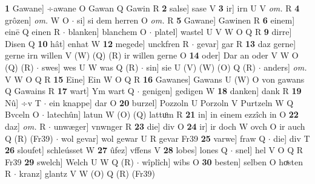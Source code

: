 \documentclass[8pt,a4paper,notitlepage]{article}
\begin{document}
\begin{table}[ht]
\begin{minipage}[t]{0.5\linewidth}
\textbf{1} Gawane] ÷awane O Gawan Q Gawin R \textbf{2} salse] sase V \textbf{3} ir] irn U V \textit{om.} R \textbf{4} grôzen] \textit{om.} W O  $\cdot$ si] si dem herren O \textit{om.} R \textbf{5} Gawane] Gawinen R \textbf{6} einem] einē Q einen R  $\cdot$ blanken] blanchem O  $\cdot$ platel] wastel U V W O Q R \textbf{9} dirre] Disen Q \textbf{10} hât] enhat W \textbf{12} megede] unckfren R  $\cdot$ gevar] gar R \textbf{13} daz gerne] gerne irn willen V (W) (Q) (R) ir willen gerne O \textbf{14} oder] Dar an oder V W O (Q) (R)  $\cdot$ swes] wes U W was Q (R)  $\cdot$ sin] sie U (V) (W) (O) Q (R)  $\cdot$ anders] \textit{om.} V W O Q R \textbf{15} Eine] Ein W O Q R \textbf{16} Gawanes] Gawans U (W) O von gawans Q Gawains R \textbf{17} wart] Ym wart Q  $\cdot$ genigen] gedigen W \textbf{18} danken] dank R \textbf{19} Nû] ÷v T  $\cdot$ ein knappe] dar O \textbf{20} burzel] Pozzoln U Porzoln V Purtzeln W Q Bvceln O  $\cdot$ latechûn] latun W (O) (Q) lattuͦm R \textbf{21} in] in einem ezzîch in O \textbf{22} daz] \textit{om.} R  $\cdot$ unwæger] vnwnger R \textbf{23} die] div O \textbf{24} ir] ir doch W ovch O ir auch Q (R) (Fr39)  $\cdot$ wol gevar] wol gewar U R gevar Fr39 \textbf{25} varwe] fraw Q  $\cdot$ die] div T \textbf{26} sloufet] schleússet W \textbf{27} ûfez] vffens V \textbf{28} lobes] lones Q  $\cdot$ snel] hel V O Q R Fr39 \textbf{29} swelch] Welch U W Q (R)  $\cdot$ wîplîch] wibs O \textbf{30} besten] selben O hoͯsten R  $\cdot$ kranz] glantz V W (O) Q (R) (Fr39) \newline
\end{minipage}
\end{table}
\end{document}
